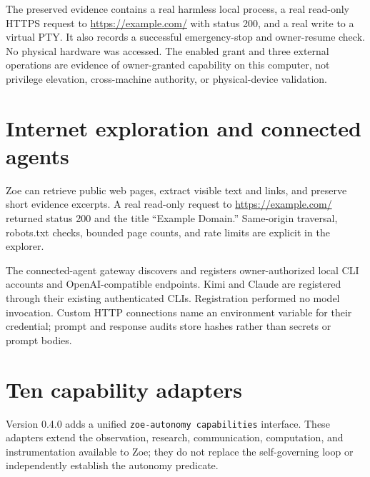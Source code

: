 \documentclass[11pt,a4paper]{article}
\begin{document}
The preserved evidence contains a real harmless local process, a real read-only HTTPS request to \url{https://example.com/} with status 200, and a real write to a virtual PTY. It also records a successful emergency-stop and owner-resume check. No physical hardware was accessed. The enabled grant and three external operations are evidence of owner-granted capability on this computer, not privilege elevation, cross-machine authority, or physical-device validation.


\section{Internet exploration and connected agents}
Zoe can retrieve public web pages, extract visible text and links, and preserve short evidence excerpts. A real read-only request to \url{https://example.com/} returned status 200 and the title ``Example Domain.'' Same-origin traversal, robots.txt checks, bounded page counts, and rate limits are explicit in the explorer.

The connected-agent gateway discovers and registers owner-authorized local CLI accounts and OpenAI-compatible endpoints. Kimi and Claude are registered through their existing authenticated CLIs. Registration performed no model invocation. Custom HTTP connections name an environment variable for their credential; prompt and response audits store hashes rather than secrets or prompt bodies.


\section{Ten capability adapters}
Version 0.4.0 adds a unified \texttt{zoe-autonomy capabilities} interface. These adapters extend the observation, research, communication, computation, and instrumentation available to Zoe; they do not replace the self-governing loop or independently establish the autonomy predicate.
\end{document}
